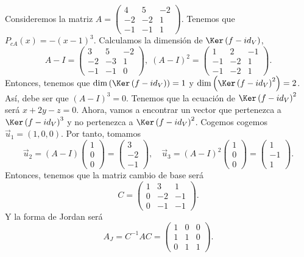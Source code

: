 \begin{eg}
	\normalfont Consideremos la matriz $\displaystyle A = \begin{pmatrix} 4 & 5 & - 2 \\ - 2 & - 2 & 1 \\ - 1 & - 1 & 1 \end{pmatrix} $. Tenemos que $\displaystyle P_{cA}\left(x\right) = - \left(x-1\right)^{3} $. Calculamos la dimensión de $\displaystyle \Ker\left(f - id _{V}\right) $,
	\[A - I = \begin{pmatrix} 3 & 5 & -2 \\ -2 & - 3 & 1 \\ - 1 & - 1 & 0 \end{pmatrix}, \; \left(A - I\right)^{2} = \begin{pmatrix} 1 & 2 & -1 \\ -1 & -2 & 1 \\ - 1 & - 2 & 1 \end{pmatrix} .\]
Entonces, tenemos que $\displaystyle \dim\left(\Ker\left(f - id _{V}\right)\right) = 1 $ y $\displaystyle \dim\left(\Ker\left(f - id _{V}\right)^{2}\right) = 2 $. Así, debe ser que $\displaystyle \left(A - I\right)^{3} = 0 $. Tenemos que la ecuación de $\displaystyle \Ker\left(f - id _{V}\right)^{2} $ será $\displaystyle x +2y - z = 0 $. Ahora, vamos a encontrar un vector que pertenezca a $\displaystyle \Ker\left(f - id _{V}\right)^{3} $ y no pertenezca a $\displaystyle \Ker\left(f - id _{V}\right)^{2} $. Cogemos cogemos $\displaystyle \vec{u}_{1} = \left(1,0,0\right) $. Por tanto, tomamos  
\[\vec{u}_{2}  = \left(A - I\right)\begin{pmatrix} 1 \\ 0 \\ 0 \end{pmatrix} = \begin{pmatrix} 3 \\ - 2 \\ -1 \end{pmatrix}, \quad \vec{u}_{3} =\left(A - I\right)^{2} \begin{pmatrix} 1 \\ 0 \\ 0 \end{pmatrix} = \begin{pmatrix} 1 \\ - 1 \\ 1 \end{pmatrix}.\]
Entonces, tenemos que la matriz cambio de base será
	\[ C = \begin{pmatrix} 1 & 3 & 1 \\ 0 & - 2& - 1 \\ 0 & - 1 & -1 \end{pmatrix} .\]
Y la forma de Jordan será
	\[ A_{J} = C^{-1}AC = \begin{pmatrix} 1 & 0 & 0 \\ 1 & 1 & 0 \\ 0 & 1 & 1 \end{pmatrix} .\]
\end{eg}
